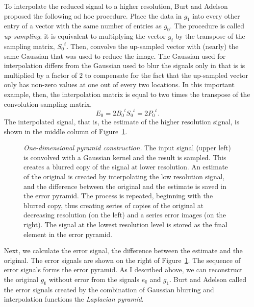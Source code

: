 To interpolate the reduced signal to a higher resolution, Burt and
Adelson proposed the following ad hoc procedure.  Place the data in
$g_1$ into every other entry of a vector with the same number of
entries as $g_0$.  The procedure is called {\em up-sampling}; it is
equivalent to multiplying the vector $g_i$ by the transpose of the
sampling matrix, ${S_0}^t$.  Then, convolve the up-sampled vector with
(nearly) the same Gaussian that was used to reduce the image.  The
Gaussian used for interpolation differs from the Gaussian used to blur
the signals only in that is is multiplied by a factor of $2$ to
compensate for the fact that the up-sampled vector only has non-zero
values at one out of every two locations.  In this important example,
then, the interpolation matrix is equal to two times the transpose of
the convolution-sampling matrix,
\begin{equation}
E_0 = 2 {B_0}^{t} {S_0}^{t} = 2 {P_0}^{t} .
\end{equation}
The interpolated signal, that is, the estimate of the higher
resolution signal, is shown in the middle column of
Figure~\ref{f7:pyramid1d}.

\begin{figure}
\centerline{
}
\caption[The One-dimensional Pyramid]{
{\em One-dimensional pyramid construction.}  The input signal
(upper left) is convolved with a Gaussian kernel and the result is
sampled.  This creates a blurred copy of the signal at lower
resolution.  An estimate of the original is created by interpolating
the low resolution signal, and the difference between the original and
the estimate is saved in the error pyramid.  The process is
repeated, beginning with the blurred copy, thus creating series of
copies of the original at decreasing resolution (on the left) and a
series error images (on the right).  The signal at the lowest
resolution level is stored as the final element in the error pyramid.
}
\label{f7:pyramid1d}
\end{figure}
Next, we calculate the error signal, the difference between the
estimate and the original.  The error signals are shown on the right
of Figure~\ref{f7:pyramid1d}.  The sequence of error signals forms the
error pyramid.  As I described above, we can reconstruct the original
$g_0$ without error from the signals $e_0$ and $g_1$. Burt and Adelson
called the error signals created by the combination of Gaussian
blurring and interpolation functions the {\em Laplacian pyramid}.

